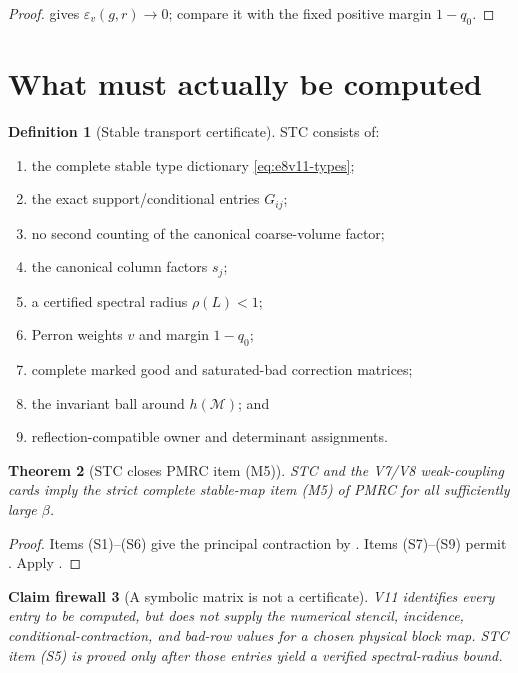 \documentclass[11pt,oneside]{book}
\newtheorem{theorem}{Theorem}[chapter]
\newtheorem{firewall}[theorem]{Claim firewall}
\theoremstyle{definition}
\newtheorem{definition}[theorem]{Definition}
\theoremstyle{remark}
\begin{document}
\begin{proof}
 gives
\(\varepsilon_v(g,r)\to0\); compare it with the fixed positive margin
\(1-q_0\).
\end{proof}

\section{What must actually be computed}
\label{sec:e8v11-computation}

\begin{definition}[Stable transport certificate]
\label{def:e8v11-card}
STC consists of:
\begin{enumerate}[label=\textup{(S\arabic*)},leftmargin=4em]
\item the complete stable type dictionary
      \eqref{eq:e8v11-types};
\item the exact support/conditional entries \(G_{ij}\);
\item no second counting of the canonical coarse-volume factor;
\item the canonical column factors \(s_j\);
\item a certified spectral radius \(\rho(L)<1\);
\item Perron weights \(v\) and margin \(1-q_0\);
\item complete marked good and saturated-bad correction matrices;
\item the invariant ball around \(h({\mathcal M})\); and
\item reflection-compatible owner and determinant assignments.
\end{enumerate}
\end{definition}

\begin{theorem}[STC closes PMRC item (M5)]
\label{thm:e8v11-card}
STC and the V7/V8 weak-coupling cards imply the strict complete
stable-map item (M5) of PMRC for all sufficiently large \(\beta\).
\end{theorem}

\begin{proof}
Items (S1)--(S6) give the principal contraction by
.  Items (S7)--(S9) permit
.  Apply
.
\end{proof}

\begin{firewall}[A symbolic matrix is not a certificate]
\label{fire:e8v11-symbolic}
V11 identifies every entry to be computed, but does not supply the
numerical stencil, incidence, conditional-contraction, and bad-row
values for a chosen physical block map.  STC item (S5) is proved only
after those entries yield a verified spectral-radius bound.
\end{firewall}
\end{document}
